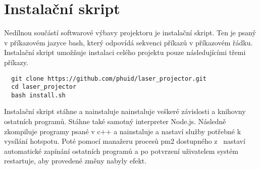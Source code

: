 





\section{Instalační skript}
Nedílnou součástí softwarové výbavy projektoru je instalační skript.
Ten je psaný v příkazovém jazyce bash, který odpovídá sekvenci příkazů v příkazovém řádku.
Instalační skript umožňuje instalaci celého projektu pouze následujícími třemi příkazy. 

\begin{verbatim}
  git clone https://github.com/phuid/laser_projector.git
  cd laser_projector
  bash install.sh
\end{verbatim}

Instalační skript stáhne a nainstaluje nainstaluje veškeré závislosti a knihovny ostatních programů. Stáhne také samotný interpreter Node.js.
Následně zkompiluje programy psané v c++ a nainstaluje a nastaví služby potřebné k vysílání hotspotu. Poté pomocí manažeru procesů pm2 dostupného z~\cite{pm2} nastaví automatické zapínání ostatních programů a po potvrzení uživatelem systém restartuje, aby provedené změny nabyly efekt.
